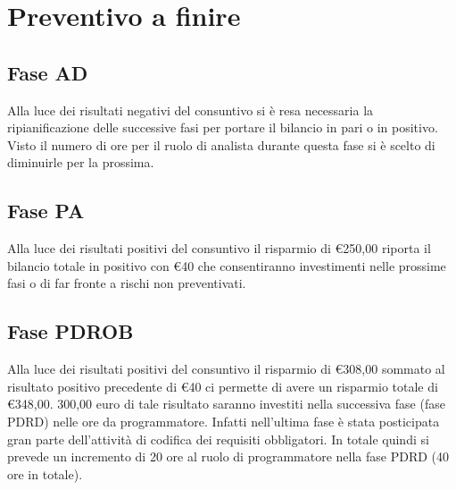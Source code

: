 \documentclass[../PianoProgetto.tex]{subfiles}
\begin{document}
\section{Preventivo a finire}

	\subsection{Fase AD}
		Alla luce dei risultati negativi del consuntivo si è resa necessaria la ripianificazione delle successive fasi per portare il bilancio in pari o in positivo. Visto il numero di ore per il ruolo di analista durante questa fase si è scelto di diminuirle per la prossima.
	
	\subsection{Fase PA}
		Alla luce dei risultati positivi del consuntivo il risparmio di \euro 250,00 riporta il bilancio totale in positivo con \euro 40 che consentiranno investimenti nelle prossime fasi o di far fronte a rischi non preventivati.
	
	\subsection{Fase PDROB}
		Alla luce dei risultati positivi del consuntivo il risparmio di \euro 308,00 sommato al risultato positivo precedente di \euro 40 ci permette di avere un risparmio totale di \euro 348,00. 300,00 euro di tale risultato saranno investiti nella successiva fase (fase PDRD) nelle ore da programmatore. Infatti nell'ultima fase è stata posticipata gran parte dell'attività di codifica dei requisiti obbligatori. In totale quindi si prevede un incremento di 20 ore al ruolo di programmatore nella fase PDRD (40 ore in totale).
	
	
\end{document}

